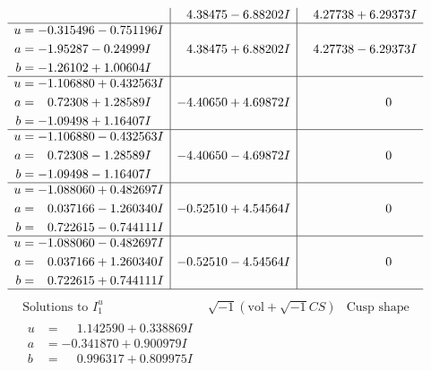 \documentclass[1p]{elsarticle_modified}
\theoremstyle{definition}
\newcommand{\I}{\sqrt{-1}}
\begin{document}
$$\begin{array}{c|c|c}
 & \phantom{-}4.38475 - 6.88202 I & \phantom{-}4.27738 + 6.29373 I \\ \hline\begin{aligned}
u &= -0.315496 - 0.751196 I \\
a &= -1.95287 - 0.24999 I \\
b &= -1.26102 + 1.00604 I\end{aligned}
 & \phantom{-}4.38475 + 6.88202 I & \phantom{-}4.27738 - 6.29373 I \\ \hline\begin{aligned}
u &= -1.106880 + 0.432563 I \\
a &= \phantom{-}0.72308 + 1.28589 I \\
b &= -1.09498 + 1.16407 I\end{aligned}
 & -4.40650 + 4.69872 I & \phantom{-0.000000 } 0 \\ \hline\begin{aligned}
u &= -1.106880 - 0.432563 I \\
a &= \phantom{-}0.72308 - 1.28589 I \\
b &= -1.09498 - 1.16407 I\end{aligned}
 & -4.40650 - 4.69872 I & \phantom{-0.000000 } 0 \\ \hline\begin{aligned}
u &= -1.088060 + 0.482697 I \\
a &= \phantom{-}0.037166 - 1.260340 I \\
b &= \phantom{-}0.722615 - 0.744111 I\end{aligned}
 & -0.52510 + 4.54564 I & \phantom{-0.000000 } 0 \\ \hline\begin{aligned}
u &= -1.088060 - 0.482697 I \\
a &= \phantom{-}0.037166 + 1.260340 I \\
b &= \phantom{-}0.722615 + 0.744111 I\end{aligned}
 & -0.52510 - 4.54564 I & \phantom{-0.000000 } 0\\
 \hline 
 \end{array}$$\newpage$$\begin{array}{c|c|c}  
\text{Solutions to }I^u_{1}& \I (\text{vol} + \sqrt{-1}CS) & \text{Cusp shape}\\
 \hline 
\begin{aligned}
u &= \phantom{-}1.142590 + 0.338869 I \\
a &= -0.341870 + 0.900979 I \\
b &= \phantom{-}0.996317 + 0.809975 I\end{aligned}

\end{array}$$
\end{document}
